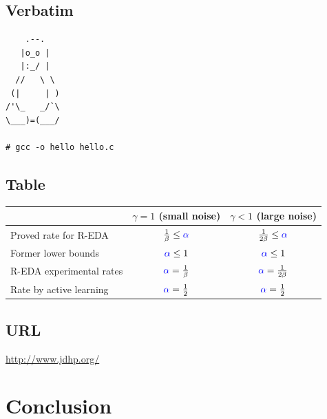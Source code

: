 \documentclass{article}
\begin{document}
\begin{small}
    
\end{small}


\subsection{Verbatim}\label{subsec:verbatim}

\begin{verbatim}
    .--.
   |o_o |
   |:_/ |
  //   \ \
 (|     | )
/'\_   _/`\
\___)=(___/

# gcc -o hello hello.c
\end{verbatim}


\subsection{Table}\label{subsec:table}

\begin{tabular}{|l|c|c|}
\hline
                          & $\gamma=1$ (small noise)                      & $\gamma<1$ (large noise) \\
\hline
Proved rate for R-EDA     & $\frac{1}{\beta} \leq {\color{blue} \alpha}$  & $\frac{1}{2\beta} \leq {\color{blue} \alpha}$ \\
\hline
Former lower bounds       & ${\color{blue} \alpha} \leq 1$                & ${\color{blue} \alpha} \leq 1$ \\
\hline
R-EDA experimental rates  & ${\color{blue} \alpha} = \frac{1}{\beta}$     & ${\color{blue} \alpha} = \frac{1}{2\beta}$ \\
\hline
\hline
Rate by active learning   & ${\color{blue} \alpha} = \frac{1}{2}$        & ${\color{blue} \alpha} = \frac{1}{2}$   \\
\hline
\end{tabular}


\subsection{URL}\label{subsec:url}

\url{http://www.jdhp.org/}


\section{Conclusion}\label{sec:ccl}
 
\end{document}
